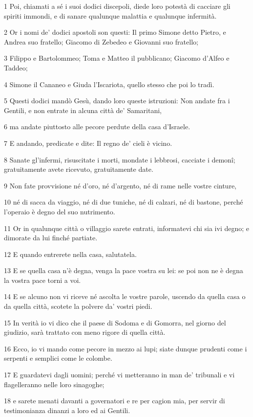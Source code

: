 \par 1 Poi, chiamati a sé i suoi dodici discepoli, diede loro potestà di cacciare gli spiriti immondi, e di sanare qualunque malattia e qualunque infermità.
\par 2 Or i nomi de' dodici apostoli son questi: Il primo Simone detto Pietro, e Andrea suo fratello; Giacomo di Zebedeo e Giovanni suo fratello;
\par 3 Filippo e Bartolommeo; Toma e Matteo il pubblicano; Giacomo d'Alfeo e Taddeo;
\par 4 Simone il Cananeo e Giuda l'Iscariota, quello stesso che poi lo tradì.
\par 5 Questi dodici mandò Gesù, dando loro queste istruzioni: Non andate fra i Gentili, e non entrate in alcuna città de' Samaritani,
\par 6 ma andate piuttosto alle pecore perdute della casa d'Israele.
\par 7 E andando, predicate e dite: Il regno de' cieli è vicino.
\par 8 Sanate gl'infermi, risuscitate i morti, mondate i lebbrosi, cacciate i demonî; gratuitamente avete ricevuto, gratuitamente date.
\par 9 Non fate provvisione né d'oro, né d'argento, né di rame nelle vostre cinture,
\par 10 né di sacca da viaggio, né di due tuniche, né di calzari, né di bastone, perché l'operaio è degno del suo nutrimento.
\par 11 Or in qualunque città o villaggio sarete entrati, informatevi chi sia ivi degno; e dimorate da lui finché partiate.
\par 12 E quando entrerete nella casa, salutatela.
\par 13 E se quella casa n'è degna, venga la pace vostra su lei: se poi non ne è degna la vostra pace torni a voi.
\par 14 E se alcuno non vi riceve né ascolta le vostre parole, uscendo da quella casa o da quella città, scotete la polvere da' vostri piedi.
\par 15 In verità io vi dico che il paese di Sodoma e di Gomorra, nel giorno del giudizio, sarà trattato con meno rigore di quella città.
\par 16 Ecco, io vi mando come pecore in mezzo ai lupi; siate dunque prudenti come i serpenti e semplici come le colombe.
\par 17 E guardatevi dagli uomini; perché vi metteranno in man de' tribunali e vi flagelleranno nelle loro sinagoghe;
\par 18 e sarete menati davanti a governatori e re per cagion mia, per servir di testimonianza dinanzi a loro ed ai Gentili.
